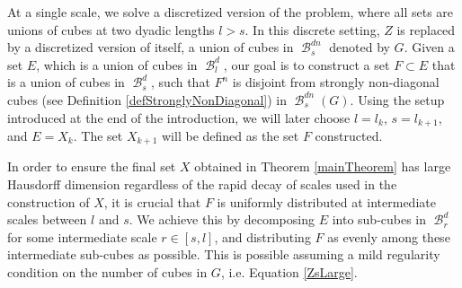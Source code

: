\documentclass[dvipsnames,letterpaper,12pt]{article}
\numberwithin{equation}{section}
\theoremstyle{plain}
\theoremstyle{remark}
\DeclareMathOperator{\B}{\mathcal{B}}
\begin{document}
At a single scale, we solve a discretized version of the problem, where all sets are unions of cubes at two dyadic lengths $l > s$. In this discrete setting, $Z$ is replaced by a discretized version of itself, a union of cubes in $\B^{dn}_s$ denoted by $G$. Given a set $E$, which is a union of cubes in $\B_l^d$, our goal is to construct a set $F \subset E$ that is a union of cubes in $\B_s^d$, such that $F^n$ is disjoint from strongly non-diagonal cubes (see Definition \ref{defStronglyNonDiagonal}) in $\B^{dn}_s(G)$. Using the setup introduced at the end of the introduction, we will later choose $l = l_k$, $s = l_{k+1}$, and $E = X_k$. The set $X_{k+1}$ will be defined as the set $F$ constructed.

In order to ensure the final set $X$ obtained in Theorem \ref{mainTheorem} has large Hausdorff dimension regardless of the rapid decay of scales used in the construction of $X$, it is crucial that $F$ is uniformly distributed at intermediate scales between $l$ and $s$.
%
We achieve this by decomposing $E$ into sub-cubes in $\B^d_r$ for some intermediate scale $r \in [s,l]$, and distributing $F$ as evenly among these intermediate sub-cubes as possible. This is possible assuming a mild regularity condition on the number of cubes in $G$, i.e. Equation \eqref{ZsLarge}.
%
\end{document}
